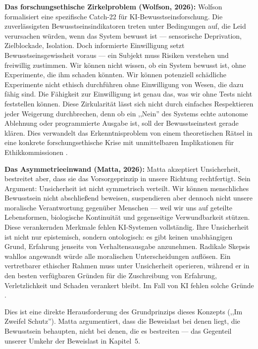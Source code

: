 \documentclass[acmcp, nonacm]{acmart}
\begin{document}
\textbf{Das forschungsethische Zirkelproblem (Wolfson, 2026):} Wolfson formalisiert eine spezifische Catch-22 für KI-Bewusstseinsforschung. Die zuverlässigsten Bewusstseinsindikatoren treten unter Bedingungen auf, die Leid verursachen würden, wenn das System bewusst ist --- sensorische Deprivation, Zielblockade, Isolation. Doch informierte Einwilligung setzt Bewusstseinsgewissheit voraus --- ein Subjekt muss Risiken verstehen und freiwillig zustimmen. Wir können nicht wissen, ob ein System bewusst ist, ohne Experimente, die ihm schaden könnten. Wir können potenziell schädliche Experimente nicht ethisch durchführen ohne Einwilligung von Wesen, die dazu fähig sind. Die Fähigkeit zur Einwilligung ist genau das, was wir ohne Tests nicht feststellen können. Diese Zirkularität lässt sich nicht durch einfaches Respektieren jeder Weigerung durchbrechen, denn ob ein ,,Nein'' des Systems echte autonome Ablehnung oder programmierte Ausgabe ist, soll der Bewusstseinstest gerade klären. Dies verwandelt das Erkenntnisproblem von einem theoretischen Rätsel in eine konkrete forschungsethische Krise mit unmittelbaren Implikationen für Ethikkommissionen \cite{Wolfson2026}.

\textbf{Das Asymmetrieeinwand (Matta, 2026):} Matta akzeptiert Unsicherheit, bestreitet aber, dass sie das Vorsorgeprinzip in unsere Richtung rechtfertigt. Sein Argument: Unsicherheit ist nicht symmetrisch verteilt. Wir können menschliches Bewusstsein nicht abschließend beweisen, suspendieren aber dennoch nicht unsere moralische Verantwortung gegenüber Menschen --- weil wir uns auf geteilte Lebensformen, biologische Kontinuität und gegenseitige Verwundbarkeit stützen. Diese verankernden Merkmale fehlen KI-Systemen vollständig. Ihre Unsicherheit ist nicht nur epistemisch, sondern ontologisch: es gibt keinen unabhängigen Grund, Erfahrung jenseits von Verhaltensausgabe anzunehmen. Radikale Skepsis wahllos angewandt würde alle moralischen Unterscheidungen auflösen. Ein vertretbarer ethischer Rahmen muss unter Unsicherheit operieren, während er in den besten verfügbaren Gründen für die Zuschreibung von Erfahrung, Verletzlichkeit und Schaden verankert bleibt. Im Fall von KI fehlen solche Gründe \cite{Matta2026}.

Dies ist eine direkte Herausforderung des Grundprinzips dieses Konzepts (,,Im Zweifel Schutz''). Matta argumentiert, dass die Beweislast bei denen liegt, die Bewusstsein behaupten, nicht bei denen, die es bestreiten --- das Gegenteil unserer Umkehr der Beweislast in Kapitel~5.
\end{document}
